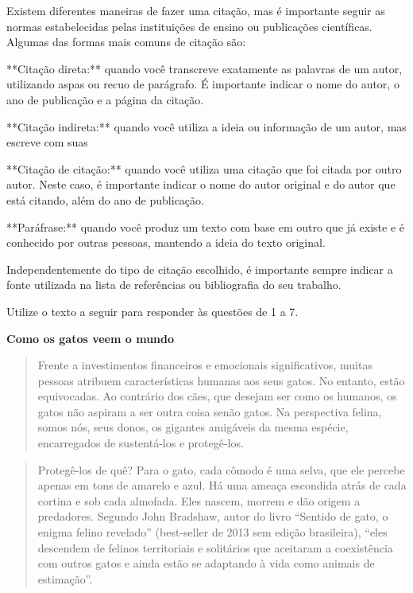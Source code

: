 {{Existem diferentes maneiras de fazer uma citação, mas é importante
seguir as normas estabelecidas pelas instituições de ensino ou
publicações científicas. Algumas das formas mais comuns de citação são:

**Citação direta:** quando você transcreve exatamente as palavras de um
autor, utilizando aspas ou recuo de parágrafo. É importante indicar o
nome do autor, o ano de publicação e a página da citação.

**Citação indireta:** quando você utiliza a ideia ou informação de um
autor, mas escreve com suas

**Citação de citação:** quando você utiliza uma citação que foi citada
por outro autor. Neste caso, é importante indicar o nome do autor
original e do autor que está citando, além do ano de publicação.

**Paráfrase:** quando você produz um texto com base em outro que já
existe e é conhecido por outras pessoas, mantendo a ideia do texto
original.

Independentemente do tipo de citação escolhido, é importante sempre
indicar a fonte utilizada na lista de referências ou bibliografia do seu
trabalho.}

Utilize o texto a seguir para responder às questões de 1 a 7.

\textbf{Como os gatos veem o mundo}

\begin{quote}
Frente a investimentos financeiros e emocionais significativos, muitas
pessoas atribuem características humanas aos seus gatos. No entanto,
estão equivocadas. Ao contrário dos cães, que desejam ser como os
humanos, os gatos não aspiram a ser outra coisa senão gatos. Na
perspectiva felina, somos nós, seus donos, os gigantes amigáveis da
mesma espécie, encarregados de sustentá-los e protegê-los.
\end{quote}

\begin{quote}
Protegê-los de quê? Para o gato, cada cômodo é uma selva, que ele
percebe apenas em tons de amarelo e azul. Há uma ameaça escondida atrás
de cada cortina e sob cada almofada. Eles nascem, morrem e dão origem a
predadores. Segundo John Bradshaw, autor do livro ``Sentido de gato, o
enigma felino revelado'' (best-seller de 2013 sem edição brasileira),
``eles descendem de felinos territoriais e solitários que aceitaram a
coexistência com outros gatos e ainda estão se adaptando à vida como
animais de estimação''.
\end{quote}

}

